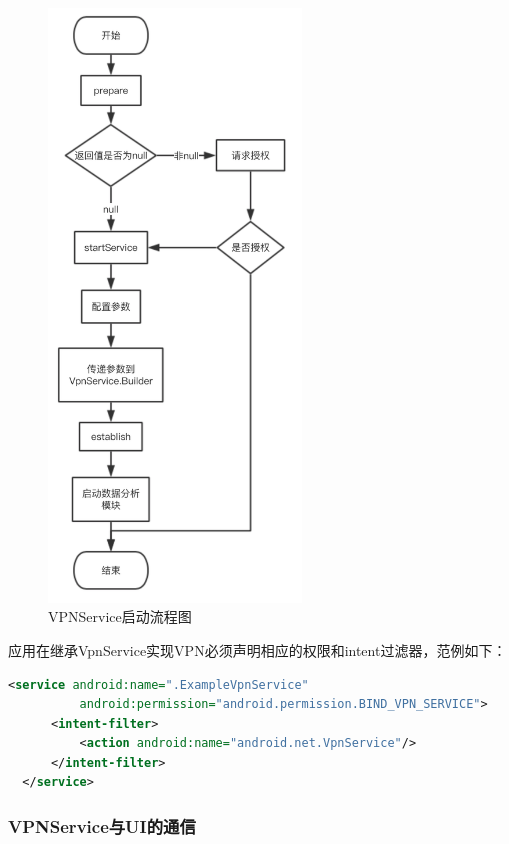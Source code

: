 \documentclass[format=final, language=chinese, degree=fyp]{hustthesis}
\begin{document}
	\begin{figure}[h]
		\centering
		\includegraphics[width=0.6\textwidth]{process_4_1_vpn.png}
		\caption{VPNService启动流程图}\label{fig:4-1-1}
	\end{figure}

 应用在继承VpnService实现VPN必须声明相应的权限和intent过滤器，范例如下：
\begin{lstlisting}[language=xml]
  <service android:name=".ExampleVpnService"
          android:permission="android.permission.BIND_VPN_SERVICE">
      <intent-filter>
          <action android:name="android.net.VpnService"/>
      </intent-filter>
  </service>
\end{lstlisting}
\FloatBarrier
\subsubsection{VPNService与UI的通信}
\end{document}
